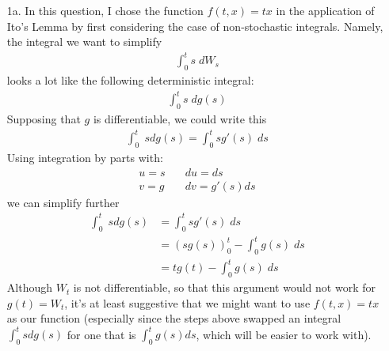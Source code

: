 \documentclass[12pt]{article}
\theoremstyle{plain}
\theoremstyle{definition}
\theoremstyle{remark}
\begin{document}
\begin{enumerate}
  \item[1a.] In this question, I chose the function $f(t,x)=tx$ in the
    application of Ito's Lemma by first considering the case of
    non-stochastic integrals. Namely, the integral we want to simplify
    \begin{align*}
      \int^t_0 s \;dW_s
    \end{align*}
    looks a lot like the following deterministic integral:
    \begin{align*}
      \int^t_0 s \;dg(s)
    \end{align*}
    Supposing that $g$ is differentiable, we could write this
    \begin{align*}
      \int^t_0 \;s dg(s)
      = \int^t_0 s g'(s) \;ds
    \end{align*}
    Using integration by parts with:
    \begin{align*}
      u = s &\quad du = ds \\
      v = g &\quad dv = g'(s) ds
    \end{align*}
    we can simplify further
    \begin{align*}
      \int^t_0 \;s dg(s)
      &= \int^t_0 s g'(s) \;ds \\
      &= \left( sg(s)\right)^t_0 - \int^t_0 g(s) \;ds \\
      &= tg(t) - \int^t_0 g(s) \;ds
    \end{align*}
    Although $W_t$ is not differentiable, so that this argument would
    not work for $g(t) = W_t$, it's at least suggestive that we might
    want to use $f(t,x) = tx$ as our function (especially since the
    steps above swapped an integral $\int^t_0 sdg(s)$ for one that is
    $\int^t_0 g(s) ds$, which will be easier to work with).


\end{enumerate}
\end{document}
